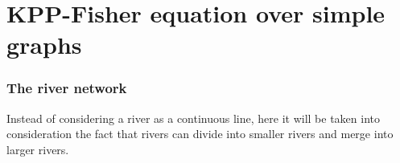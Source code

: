 \section{KPP-Fisher equation over simple graphs}


\begin{frame}
    \frametitle{The river network}
    Instead of considering a river as a continuous line, here it will be taken into consideration the fact that rivers can divide into smaller rivers and merge into larger rivers. 
\begin{figure}[H]
    \centering
    \scalebox{0.6}{\begin{tikzpicture}[x=0.75pt,y=0.75pt,yscale=-1,xscale=1]


\end{tikzpicture}}
\end{figure}
\end{frame}
